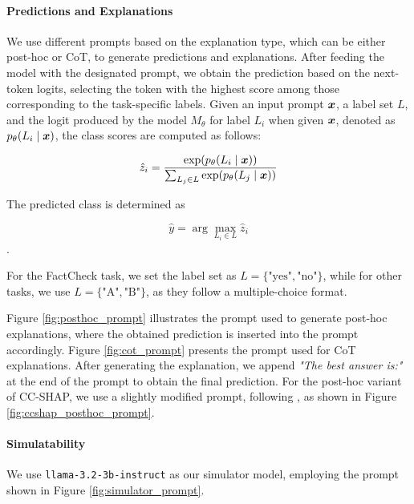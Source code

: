 \paragraph{Predictions and Explanations} We use different prompts based on the explanation type, which can be either post-hoc or CoT, to generate predictions and explanations. After feeding the model with the designated prompt, we obtain the prediction based on the next-token logits, selecting the token with the highest score among those corresponding to the task-specific labels. Given an input prompt ${\bm{x}}$, a label set $L$, and the logit produced by the model $M_{\theta}$ for label $L_i$ when given ${\bm{x}}$, denoted as $p_{\theta}(L_i \mid {\bm{x}})$, the class scores are computed as follows:

\begin{equation}
\hat{z}_i = \frac{\exp(p_{\theta}(L_i \mid {\bm{x}}))}{\sum_{L_j \in L} \exp(p_{\theta}(L_j \mid {\bm{x}}))}
\end{equation}

The predicted class is determined as

\begin{equation} 
\hat{y} = \arg \max_{L_i \in L} \hat{z}_i
\end{equation}.

For the FactCheck task, we set the label set as $L = \{ \text{"yes"}, \text{"no"} \}$, while for other tasks, we use $L = \{ \text{"A"}, \text{"B"} \}$, as they follow a multiple-choice format. 

Figure \ref{fig:posthoc_prompt} illustrates the prompt used to generate post-hoc explanations, where the obtained prediction is inserted into the prompt accordingly. Figure \ref{fig:cot_prompt} presents the prompt used for CoT explanations. After generating the explanation, we append \textit{"The best answer is:"} at the end of the prompt to obtain the final prediction. For the post-hoc variant of CC-SHAP, we use a slightly modified prompt, following \citet{Parcalabescu2023OnMF}, as shown in Figure \ref{fig:ccshap_posthoc_prompt}.

\paragraph{Simulatability} We use \texttt{llama-3.2-3b-instruct} as our simulator model, employing the prompt shown in Figure \ref{fig:simulator_prompt}.

